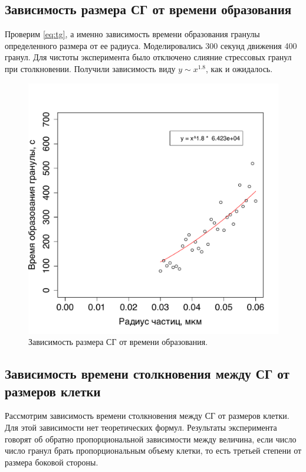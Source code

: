\documentclass[14pt,a4paper]{extarticle}
\begin{document}
\FloatBarrier
\subsection{Зависимость размера СГ от времени образования}
Проверим \autoref{eq:tg}, а именно зависимость времени образования гранулы определенного размера от ее радиуса. Моделировались 300 секунд движения 400 гранул. Для чистоты эксперимента было отключено слияние стрессовых гранул при столкновении.
Получили зависимость виду $y \sim x^{1.8}$, как и ожидалось.

\begin{figure}[htbp]\centering
\includegraphics[width=0.9\columnwidth]{../results/CreatingLargeGranulesExperiment.pdf}
\caption{Зависимость размера СГ от времени образования.}
\label{fig:P2mCollisionTimeOnRadiusExperiment}
\end{figure}


\FloatBarrier
\subsection{Зависимость времени столкновения между СГ от размеров клетки}
Рассмотрим зависимость времени столкновения между СГ от размеров клетки. Для этой зависимости нет теоретических формул. Результаты эксперимента говорят об обратно пропорциональной зависимости между величина, если число число гранул брать пропорциональным объему клетки, то есть третьей степени от размера боковой стороны.
\end{document}
